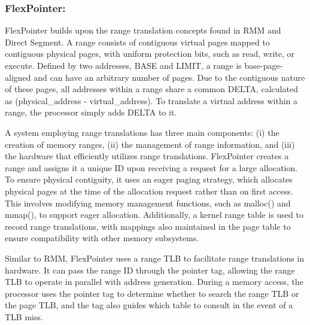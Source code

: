 \subsubsection{FlexPointer:}
FlexPointer\cite{chen_flexpointer_2023} builds upon the range translation concepts found in RMM and Direct Segment. A range consists of contiguous virtual pages mapped 
to contiguous physical pages, with uniform protection bits, such as read, write, or execute. Defined by two addresses, BASE and LIMIT,
a range is base-page-aligned and can have an arbitrary number of pages. Due to the contiguous nature of these pages, 
all addresses within a range share a common DELTA, calculated as (physical\_address - virtual\_address). To translate a 
virtual address within a range, the processor simply adds DELTA to it.

A system employing range translations has three main components: 
(i) the creation of memory ranges, (ii) the management of range information, 
and (iii) the hardware that efficiently utilizes range translations. FlexPointer 
creates a range and assigns it a unique ID upon receiving a request for a large 
allocation. To ensure physical contiguity, it uses an eager paging strategy, 
which allocates physical pages at the time of the allocation request rather 
than on first access. This involves modifying memory management functions, 
such as malloc() and mmap(), to support eager allocation. Additionally, 
a kernel range table is used to record range translations, with mappings 
also maintained in the page table to ensure compatibility with other memory subsystems.

Similar to RMM, FlexPointer uses a range TLB to facilitate range translations in hardware. 
It can pass the range ID through the pointer tag, allowing the range TLB to operate in 
parallel with address generation. During a memory access, the processor uses the 
pointer tag to determine whether to search the range TLB or the page TLB, and the 
tag also guides which table to consult in the event of a TLB miss.

